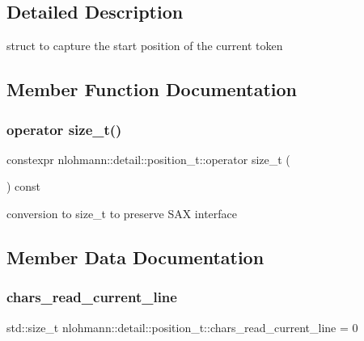 \subsection{Detailed Description}
struct to capture the start position of the current token 

\subsection{Member Function Documentation}
\mbox{\label{structnlohmann_1_1detail_1_1position__t_ac9ad1e0f143f162e2e0c979cd678d683}} 
\subsubsection{\texorpdfstring{operator size\_t()}{operator size\_t()}}
{\footnotesize\ttfamily constexpr nlohmann\+::detail\+::position\+\_\+t\+::operator size\+\_\+t (\begin{DoxyParamCaption}{ }\end{DoxyParamCaption}) const\hspace{0.3cm}{\ttfamily [inline]}}



conversion to size\+\_\+t to preserve S\+AX interface 



\subsection{Member Data Documentation}
\mbox{\label{structnlohmann_1_1detail_1_1position__t_a74df94563dd32102152ceb8c6d9041d8}} 
\subsubsection{\texorpdfstring{chars\_read\_current\_line}{chars\_read\_current\_line}}
{\footnotesize\ttfamily std\+::size\+\_\+t nlohmann\+::detail\+::position\+\_\+t\+::chars\+\_\+read\+\_\+current\+\_\+line = 0}




